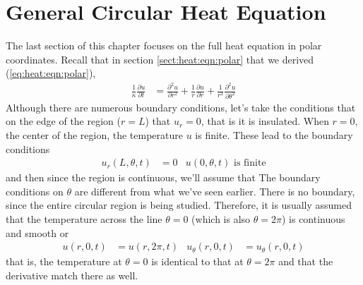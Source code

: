 \section{General Circular Heat Equation}


The last section of this chapter focuses on the full heat equation in polar coordinates.  Recall that in section \ref{sect:heat:eqn:polar} that we derived (\ref{eq:heat:eqn:polar}),
%
\begin{align*}
\frac{1}{\kappa} \frac{\partial u}{\partial t} & = \frac{\partial^2 u}{\partial {r}^2}  + \frac{1}{r} \frac{\partial u}{\partial r}+ \frac{1}{r^2} \frac{\partial^2 u}{\partial {\theta}^2}
\end{align*}
Although there are numerous boundary conditions, let's take the conditions that on the edge of the region ($r=L$) that $u_r =0$, that is it is insulated.  When $r=0$, the center of the region, the temperature $u$ is finite.  These lead to the boundary conditions
%
\begin{align}
u_r(L,\theta,t) & = 0 & u(0,\theta,t) \text{~is finite} \label{eq:heat:eqn:polar:bc1}
\end{align}
and then since the region is continuous, we'll assume that
%
The boundary conditions on $\theta$ are different from what we've seen earlier.  There is no boundary, since the entire circular region is being studied.  Therefore, it is usually assumed that the temperature across the line $\theta=0$ (which is also $\theta=2\pi$) is continuous and smooth or
\begin{align}
u(r,0,t) &= u(r,2\pi,t)&  u_{\theta}(r,0,t) & = u_{\theta} (r,0,t) \label{eq:heat:eqn:polar:bc2}
\end{align}
that is, the temperature at $\theta=0$ is identical to that at $\theta=2\pi$ and that the derivative match there as well.


